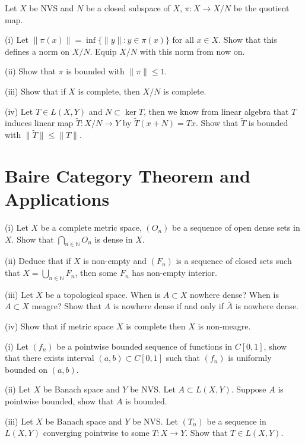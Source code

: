\documentclass[12pt]{article}
\newcommand{\N}{\mathbb{N}}
\newenvironment{question}[2][Question]{\begin{trivlist}
\item[\hskip \labelsep {\bfseries #1}\hskip \labelsep {\bfseries #2.}]}{\end{trivlist}}
\begin{document}
\begin{question}{1.6(Quotient Norm)}
	Let $X$ be NVS and $N$ be a closed subspace of $X$, $\pi:X \rightarrow X/N$ be the quotient map. 
	
	(i) Let $\|\pi(x)\| = \inf\{\|y\|: y \in \pi(x)\}$ for all $x \in X$. Show that this defines a norm on $X/N$. Equip $X/N$ with this norm from now on.
	
	(ii) Show that $\pi$ is bounded with $\|\pi\| \leq 1$.
	
	(iii) Show that if $X$ is complete, then $X/N$ is complete.
	
	(iv) Let $T \in L(X,Y)$ and $N \subset \ker T$, then we know from linear algebra that $T$ induces linear map $\tilde{T}:X/N \rightarrow Y$ by $\tilde{T}(x + N) = Tx$. Show that $\tilde{T}$ is bounded with $\|\tilde{T}\| \leq \|T\|$.
	
\end{question}


\section{Baire Category Theorem and  Applications}
\begin{question}{2.1(Baire Category Theorem)}
	(i) Let $X$ be a complete metric space, $(O_n)$ be a sequence of open dense sets in $X$. Show that $\bigcap_{n\in \N}O_n$ is dense in $X$.
	
	(ii) Deduce that if $X$ is non-empty and $(F_n)$ is a sequence of closed sets such that $X = \bigcup_{n\in \N}F_n$, then some $F_n$ has non-empty interior.
	
	(iii) Let $X$ be a topological space. When is $A\subset X$ nowhere dense? When is $A\subset X$ meagre? Show that $A$ is nowhere dense if and only if $\bar A$ is nowhere dense. 
	
	(iv) Show that if metric space $X$ is complete then $X$ is non-meagre.
\end{question}

\begin{question}{2.2(Uniform Boundedness)}
	(i) Let $(f_n)$ be a pointwise bounded sequence of functions in $C[0,1]$, show that there exists interval $(a,b) \subset C[0,1]$ such that $(f_n)$ is uniformly bounded on $(a,b)$. 
	
	(ii) Let $X$ be Banach space and $Y$ be NVS. Let $A \subset L(X,Y)$. Suppose $A$ is pointwise bounded, show that $A$ is bounded.
	
	(iii) Let $X$ be Banach space and $Y$ be NVS. Let $(T_n)$ be a sequence in $L(X,Y)$ converging pointwise to some $T:X\rightarrow Y$. Show that $T \in L(X,Y)$.
\end{question}
\end{document}

